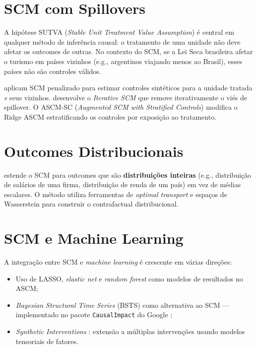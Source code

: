 \documentclass[12pt, a4paper, openany]{book}
\begin{document}
\section{SCM com Spillovers}

A hipótese SUTVA (\textit{Stable Unit Treatment Value Assumption}) é central em qualquer método de inferência causal: o tratamento de uma unidade não deve afetar os outcomes de outras. No contexto do SCM, se a Lei Seca brasileira afetar o turismo em países vizinhos (e.g., argentinos viajando menos ao Brasil), esses países não são controles válidos.

\cite{GrossiEtAl2024} aplicam SCM penalizado para estimar controles sintéticos para a unidade tratada \textit{e} seus vizinhos. \cite{Melnychuk2024} desenvolve o \textit{Iterative SCM} que remove iterativamente o viés de spillover. O ASCM-SC (\textit{Augmented SCM with Stratified Controls}) modifica o Ridge ASCM estratificando os controles por exposição ao tratamento.


\section{Outcomes Distribucionais}

\cite{Gunsilius2023} estende o SCM para outcomes que são \textbf{distribuições inteiras} (e.g., distribuição de salários de uma firma, distribuição de renda de um país) em vez de médias escalares. O método utiliza ferramentas de \textit{optimal transport} e espaços de Wasserstein para construir o contrafactual distribucional.


\section{SCM e Machine Learning}

A integração entre SCM e \textit{machine learning} é crescente em várias direções:
\begin{itemize}[leftmargin=1.5cm]
  \item Uso de LASSO, \textit{elastic net} e \textit{random forest} como modelos de resultados no ASCM;
  \item \textit{Bayesian Structural Time Series} (BSTS) como alternativa ao SCM --- implementado no pacote \texttt{CausalImpact} do Google \citep{BrodersenEtAl2015};
  \item \textit{Synthetic Interventions} \citep{AgarwalEtAl2025}: extensão a múltiplas intervenções usando modelos tensoriais de fatores.
\end{itemize}
\end{document}
